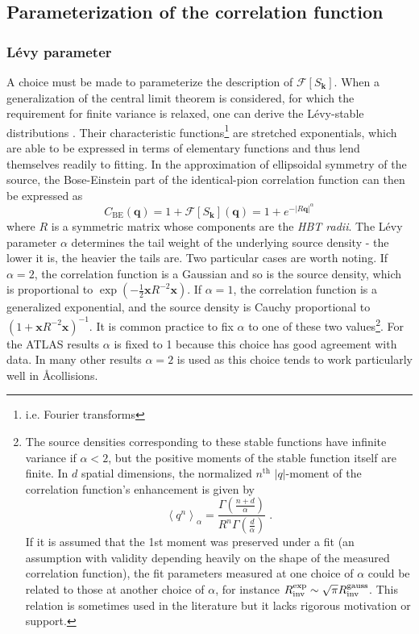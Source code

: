 \subsection{Parameterization of the correlation function}

\subsubsection{L\'evy parameter}

A choice must be made to parameterize the description of $\mathcal{F}[S_\mathbf{k}]$.
When a generalization of the central limit theorem is considered, for which the requirement for finite variance is relaxed, one can derive the L\'evy-stable distributions \cite{Csorgo:2003uv}.
Their characteristic functions\footnote{i.e. Fourier transforms} are stretched exponentials, which are able to be expressed in terms of elementary functions and thus lend themselves readily to fitting.
In the approximation of ellipsoidal symmetry of the source, the Bose-Einstein part of the identical-pion correlation function can then be expressed as
\begin{equation} C_{\textrm{BE}}(\mathbf{q}) = 1 + \mathcal{F}[S_\mathbf{k}](\mathbf{q}) = 1 + e^{- \left|R \mathbf{q} \right|^{\alpha} } \end{equation}
where $R$ is a symmetric matrix whose components are the \emph{HBT radii}.
The L\'evy parameter $\alpha$ determines the tail weight of the underlying source density - the lower it is, the heavier the tails are.
Two particular cases are worth noting.
If $\alpha = 2$, the correlation function is a Gaussian and so is the source density, which is proportional to \( \exp\left(-\frac{1}{2} \mathbf{x} R^{-2} \mathbf{x}\right) \).
If $\alpha = 1$, the correlation function is a generalized exponential, and the source density is Cauchy proportional to \( \left( 1 + \mathbf{x} R^{-2} \mathbf{x} \right)^{-1} \).
It is common practice to fix $\alpha$ to one of these two values\footnote{The source densities corresponding to these stable functions have infinite variance if $\alpha < 2$, but the positive moments of the stable function itself are finite.
In $d$ spatial dimensions, the normalized $n^\textrm{th}$ $|q|$-moment of the correlation function's enhancement is given by
\begin{equation}
\left< q^n \right>_{\alpha} = \frac{\Gamma\left(\frac{n+d}{\alpha}\right)}{R^n \Gamma\left(\frac{d}{\alpha}\right)} \; .
\end{equation}
If it is assumed that the 1st moment was preserved under a fit (an assumption with validity depending heavily on the shape of the measured correlation function), the fit parameters measured at one choice of $\alpha$ could be related to those at another choice of $\alpha$, for instance $R_{\mathrm{inv}}^{\textrm{exp}} \sim \sqrt{\pi} R_{\mathrm{inv}}^{\textrm{gauss}}$.
This relation is sometimes used in the literature but it lacks rigorous motivation or support.}.
For the ATLAS \pPb results $\alpha$ is fixed to 1 because this choice has good agreement with data.
In many other results $\alpha = 2$ is used as this choice tends to work particularly well in \AA collisions.

